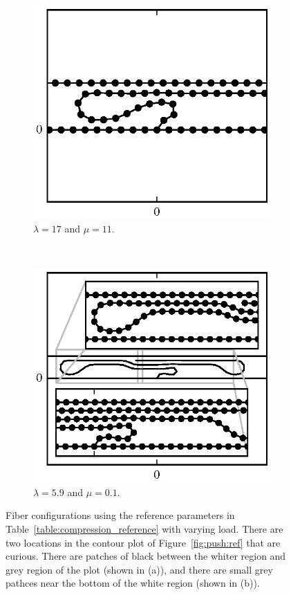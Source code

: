 {	\begin{figure}[th!]
		\centering
		\begin{subfigure}{.5\textwidth}
			\centering
			\includegraphics{./fig/ch3/push/ref/l17_m11.eps}
			\caption{$\lambda=17$ and $\mu=11$.\label{subfig:tight_loop}}
		\end{subfigure}%
		~
		\begin{subfigure}{.5\textwidth}
			\centering
			\includegraphics{./fig/ch3/push/ref/l5.9_m0.1.eps}
			\caption{$\lambda=5.9$ and $\mu=0.1$.\label{subfig:tight_hairpin}}
		\end{subfigure}
		\caption{Fiber configurations using the reference parameters in Table~\ref{table:compression_reference} with varying load. There are two locations in the contour plot of Figure~\ref{fig:push:ref} that are curious. There are patches of black between the whiter region and grey region of the plot (shown in (a)), and there are small grey pathces near the bottom of the white region (shown in (b)).\label{fig:ref_special}}
	\end{figure}

}
